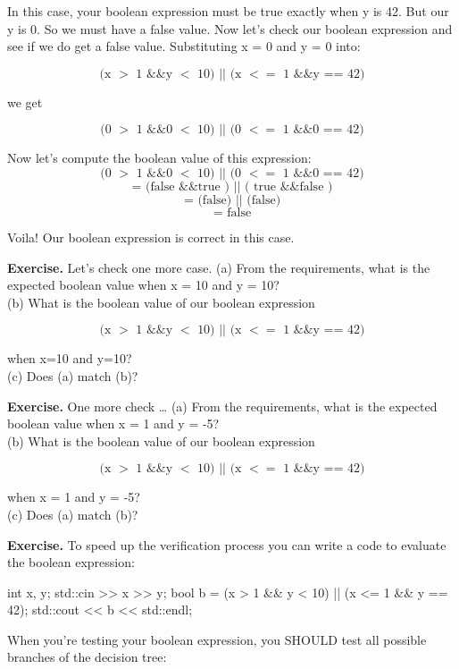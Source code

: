 {{{{{{In this case, your boolean expression must be true exactly when y is 42.
But our y is 0. So we must have a false value. Now let's check our
boolean expression and see if we do get a false value. Substituting x = 0
and y = 0 into:

\[\text{(x $>$ 1 \&\& y $<$ 10) $||$ (x $<=$ 1 \&\& y == 42)}\]

we get

\[\text{(0 $>$ 1 \&\& 0 $<$ 10) $||$ (0 $<=$ 1 \&\& 0 == 42)}\]

Now let's compute the boolean value of this expression:
\[\text{(0 $>$ 1 \&\& 0 $<$ 10) $||$ (0 $<=$ 1 \&\& 0 == 42)}\]
\[\text{= (false \&\& true ) $||$ ( true \&\& false )}\]
\[\text{= (false) $||$ (false)}\]
\[\text{= false}\]

Voila! Our boolean expression is correct in this case.

\textbf{Exercise.} Let's check one more case.
(a) From the requirements, what is the expected boolean value when x = 10 and y = 10?\\
(b) What is the boolean value of our boolean expression

\[\text{(x $>$ 1 \&\& y $<$ 10) || (x $<=$ 1 \&\& y == 42)}\]

when x=10 and y=10?\\
(c) Does (a) match (b)?

\textbf{Exercise.} One more check \dots
(a) From the requirements, what is the expected boolean value when x =
1 and y = -5?\\

(b) What is the boolean value of our boolean expression

\[\text{(x $>$ 1 \&\& y $<$ 10) $||$ (x $<=$ 1 \&\& y == 42)}\]

when x = 1 and y = -5?\\
(c) Does (a) match (b)?


\textbf{Exercise.} To speed up the verification process you can write a code to evaluate the boolean expression:
\begin{console}
int x, y;
std::cin >> x >> y;
bool b = (x > 1 && y < 10) || (x <= 1 && y == 42);
std::cout << b << std::endl;
\end{console}

When you're testing your boolean expression, you SHOULD test all
possible branches of the decision tree:

\begin{tikzpicture}
  [
    node distance=2.3cm and 2.5cm,
    invisible/.style=
    {
      inner sep=0pt,
      outer sep=0pt,
      align=right,
      text opacity=1,
      draw=none,
      fill=none,
      minimum size=0pt
    },
    leaf node/.style=
    {
      rectangle,
      draw,
      minimum width=1cm,
      minimum height=1cm,
      font=\small
    }
    every edge/.style={draw,->,>=stealth},
    edge label/.style={midway,font=\small,draw=none,fill=none,inner sep=5pt}
  ]


\end{tikzpicture}}}}}}}
